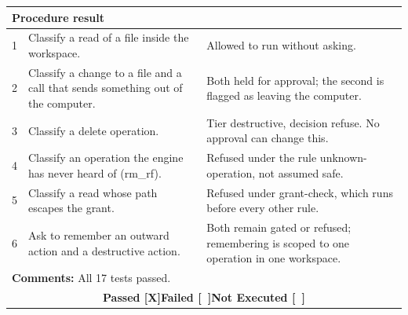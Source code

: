 \documentclass{FastFyp}
\begin{document}
{\begin{longtable}{|p{2.4cm}p{5.0cm}p{2.4cm}p{3.8cm}|}
  \multicolumn{2}{p{6.6cm}|}{\textbf{Procedure result}} \\ \hline
\multicolumn{1}{|p{2.4cm}|}{1} & \multicolumn{1}{p{5.0cm}|}{Classify a read of a file inside the workspace.} & \multicolumn{2}{p{6.6cm}|}{Allowed to run without asking.} \\ \hline
\multicolumn{1}{|p{2.4cm}|}{2} & \multicolumn{1}{p{5.0cm}|}{Classify a change to a file and a call that sends something out of the computer.} & \multicolumn{2}{p{6.6cm}|}{Both held for approval; the second is flagged as leaving the computer.} \\ \hline
\multicolumn{1}{|p{2.4cm}|}{3} & \multicolumn{1}{p{5.0cm}|}{Classify a delete operation.} & \multicolumn{2}{p{6.6cm}|}{Tier destructive, decision refuse. No approval can change this.} \\ \hline
\multicolumn{1}{|p{2.4cm}|}{4} & \multicolumn{1}{p{5.0cm}|}{Classify an operation the engine has never heard of (rm\_rf).} & \multicolumn{2}{p{6.6cm}|}{Refused under the rule unknown-operation, not assumed safe.} \\ \hline
\multicolumn{1}{|p{2.4cm}|}{5} & \multicolumn{1}{p{5.0cm}|}{Classify a read whose path escapes the grant.} & \multicolumn{2}{p{6.6cm}|}{Refused under grant-check, which runs before every other rule.} \\ \hline
\multicolumn{1}{|p{2.4cm}|}{6} & \multicolumn{1}{p{5.0cm}|}{Ask to remember an outward action and a destructive action.} & \multicolumn{2}{p{6.6cm}|}{Both remain gated or refused; remembering is scoped to one operation in one workspace.} \\ \hline
\multicolumn{4}{|p{14.8cm}|}{\textbf{Comments:} All 17 tests passed.} \\ \hline
\multicolumn{4}{|c|}{\textbf{Passed [X]\quad Failed [\ ]\quad Not Executed [\ ]}} \\ \hline
\end{longtable}
}
\end{document}
